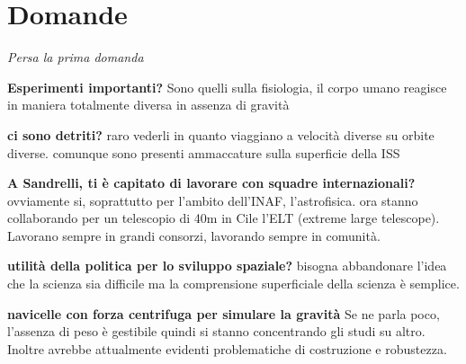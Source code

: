 \documentclass[a4paper,12pt, oneside]{book}
\begin{document}
\section{Domande}
\textit{Persa la prima domanda}
\begin{domanda}
\textbf{Esperimenti importanti?}
Sono quelli sulla fisiologia, il corpo umano reagisce in maniera totalmente diversa in assenza di gravità
\end{domanda}
\begin{domanda}
\textbf{ci sono detriti?}
raro vederli in quanto viaggiano a velocità diverse su orbite diverse. comunque sono presenti ammaccature sulla superficie della ISS
\end{domanda}
\begin{domanda}
\textbf{A Sandrelli, ti è capitato di lavorare con squadre internazionali?}
ovviamente si, soprattutto per l'ambito dell'INAF, l'astrofisica. ora stanno collaborando per un telescopio di 40m in Cile l'ELT (extreme large telescope). Lavorano sempre in grandi consorzi, lavorando sempre in comunità.
\end{domanda}
\begin{domanda}
\textbf{utilità della politica per lo sviluppo spaziale?}
bisogna abbandonare l'idea che la scienza sia difficile ma la comprensione superficiale della scienza è semplice. 
\end{domanda}
\begin{domanda}
\textbf{navicelle con forza centrifuga per simulare la gravità}
Se ne parla poco, l'assenza di peso è gestibile quindi si stanno concentrando gli studi su altro. Inoltre avrebbe attualmente evidenti problematiche di costruzione e robustezza.
\end{domanda}
\end{document}

